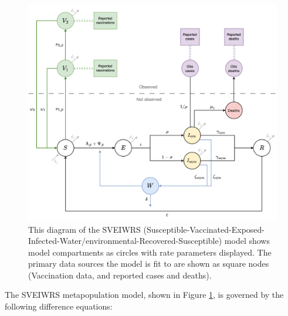 \documentclass[
]{book}
\begin{document}
\begin{figure}

{\centering \includegraphics[width=0.95\linewidth]{diagrams/v_0_3.drawio} 

}

\caption{This diagram of the SVEIWRS (Susceptible-Vaccinated-Exposed-Infected-Water/environmental-Recovered-Susceptible) model shows model compartments as circles with rate parameters displayed. The primary data sources the model is fit to are shown as square nodes (Vaccination data, and reported cases and deaths).}\label{fig:diagram}
\end{figure}

The SVEIWRS metapopulation model, shown in Figure \ref{fig:diagram}, is governed by the following difference equations:
\end{document}
